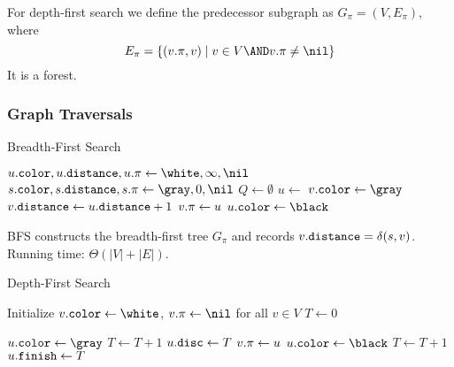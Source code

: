 For depth-first search we define the predecessor subgraph as \(G_\pi=(V,E_\pi)\), where
\[
E_\pi = \{(v.\pi,v)\mid v\in V \AND v.\pi \neq \nil\}
\]
It is a forest.

\subsubsection{Graph Traversals} \label{sec:graph-traversals}

\begin{algorithm}[H]
\caption{Breadth-First Search}\label{alg:bfs}
\begin{algorithmic}[1]
 
    \State $\attrib{u}{color},\attrib{u}{distance},\attrib{u}{\pi}\gets \white,\infty,\nil$
  \EndFor
  \State $\attrib{s}{color},\attrib{s}{distance},\attrib{s}{\pi}\gets \gray,0,\nil$
  \State $Q\gets\emptyset$ 
  \State {}
    \State $u\gets$ 
        \State $\attrib{v}{color}\gets\gray$
        \State $v\mathtt{.}\mathtt{distance}\gets u\mathtt{.}\mathtt{distance}+1$
        \State $v\mathtt{.}\mathtt{\pi}\gets u$
        \State {}
      \EndIf
    \EndFor
    \State $\attrib{u}{color}\gets\black$
  \EndWhile
\EndFunction
\end{algorithmic}
\end{algorithm}

BFS constructs the breadth-first tree $G_{\pi}$ and records
$v\mathtt{.}\mathtt{distance}=\delta(s,v)$.
Running time: $\Theta(|V|+|E|)$.


\begin{algorithm}[H]
\caption{Depth-First Search}\label{alg:dfs}
\begin{algorithmic}[1]
  \State Initialize $\attrib{v}{color}\gets\white$, $\attrib{v}{\pi}\gets\nil$ for all $v\in V$
  \State $T\gets 0$
      \EndIf
  \EndFor
\EndFunction

  \State $\attrib{u}{color}\gets\gray$
  \State $T\gets T+1$
  \State $u\mathtt{.}\mathtt{disc}\gets T$
      \State $v\mathtt{.}\mathtt{\pi}\gets u$
      \State {}
    \EndIf
  \EndFor
  \State $\attrib{u}{color}\gets\black$
  \State $T\gets T+1$
  \State $u\mathtt{.}\mathtt{finish}\gets T$
\EndFunction
\end{algorithmic}
\end{algorithm}

